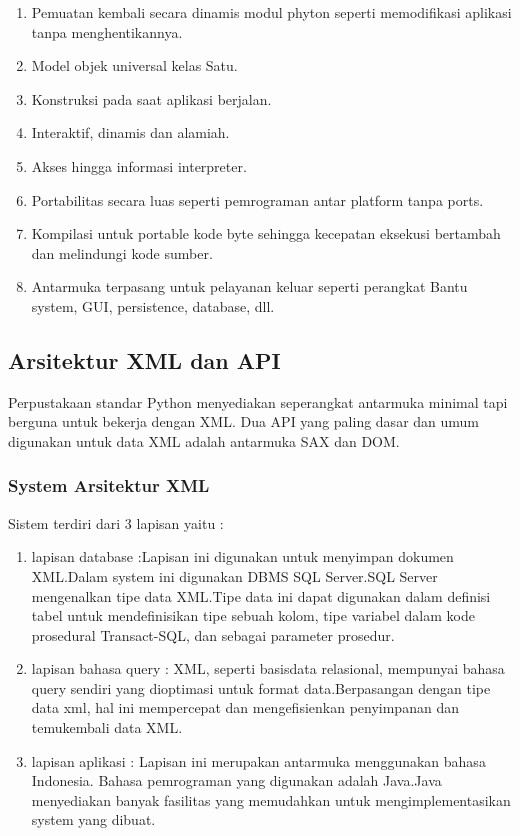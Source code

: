 \begin{enumerate}
\item Pemuatan kembali secara dinamis modul phyton seperti memodifikasi aplikasi tanpa menghentikannya.
\item Model objek universal kelas Satu.
\item Konstruksi pada saat aplikasi berjalan.
\item Interaktif, dinamis dan alamiah.
\item Akses hingga informasi interpreter.
\item Portabilitas secara luas seperti pemrograman antar platform tanpa ports.
\item Kompilasi untuk portable kode byte sehingga kecepatan eksekusi bertambah dan melindungi kode sumber.
\item Antarmuka terpasang untuk pelayanan keluar seperti perangkat Bantu system, GUI, persistence, database, dll.
\end{enumerate}
 
\subsection {Arsitektur XML dan API}
  Perpustakaan standar Python menyediakan seperangkat antarmuka minimal tapi berguna untuk bekerja dengan XML. Dua API yang paling dasar dan umum digunakan untuk data XML adalah antarmuka SAX dan DOM. 
\subsubsection {System Arsitektur XML}
Sistem terdiri dari 3 lapisan yaitu :
\begin{enumerate}
\item lapisan database :Lapisan ini digunakan untuk menyimpan dokumen XML.Dalam system ini digunakan DBMS SQL Server.SQL
Server mengenalkan tipe data XML.Tipe data ini dapat digunakan dalam definisi tabel untuk mendefinisikan tipe sebuah kolom, tipe variabel dalam kode prosedural Transact-SQL, dan sebagai parameter prosedur.
\item lapisan bahasa query : XML, seperti basisdata relasional, mempunyai bahasa query sendiri yang dioptimasi untuk format data.Berpasangan dengan tipe data xml, hal ini mempercepat dan mengefisienkan penyimpanan dan temukembali data XML.
\item lapisan aplikasi : Lapisan ini merupakan antarmuka menggunakan bahasa Indonesia. Bahasa pemrograman yang digunakan adalah Java.Java menyediakan banyak fasilitas yang memudahkan untuk mengimplementasikan system yang dibuat.
\end{enumerate}

